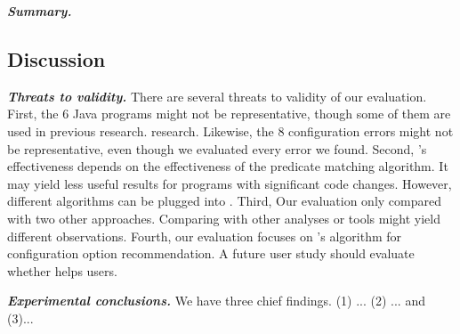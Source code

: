 
\vspace{1mm}
\noindent \textbf{\textit{Summary.}} 

\subsection{Discussion}

\noindent \textbf{\textit{Threats to validity.}}
There are several threats to validity of our evaluation.
First, the 6 Java programs might not be representative, though some of them are used
in previous research. research. Likewise, the
8 configuration errors might not be representative, even though we
evaluated every error we found. Second, 
\ourtool's effectiveness depends on the effectiveness of the
predicate matching algorithm. It may yield less
useful results for programs with significant code changes.
However, different algorithms can be plugged into \ourtool.
Third, Our evaluation only compared \ourtool with two other
approaches. Comparing with other analyses or tools might yield
different observations.
Fourth, our evaluation focuses on \ourtool's algorithm for
configuration option recommendation. A future user study should
evaluate whether \ourtool helps users.

\vspace{1mm}

\noindent \textbf{\textit{Experimental conclusions.}}
We have three chief findings. (1) ...  (2) ... and (3)...

